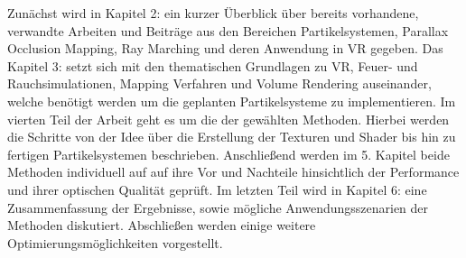 Zunächst wird in Kapitel 2: \textbf{} ein kurzer Überblick über bereits vorhandene, verwandte Arbeiten
und Beiträge aus den Bereichen Partikelsystemen, Parallax Occlusion Mapping, Ray Marching und deren Anwendung in VR gegeben.
Das Kapitel 3: \textbf{} setzt sich mit den thematischen Grundlagen zu VR, Feuer- und Rauchsimulationen,
Mapping Verfahren und Volume Rendering auseinander, welche benötigt werden um die geplanten Partikelsysteme zu implementieren.
Im vierten Teil der Arbeit geht es um die \textbf{} der gewählten Methoden. Hierbei werden die Schritte 
von der Idee über die Erstellung der Texturen und Shader bis hin zu fertigen Partikelsystemen beschrieben.
Anschließend werden im 5. Kapitel \textbf{} beide  Methoden individuell auf auf ihre Vor und Nachteile hinsichtlich 
der Performance und ihrer optischen Qualität geprüft. 
Im letzten Teil wird in Kapitel 6: \textbf{} eine Zusammenfassung der Ergebnisse, sowie mögliche Anwendungsszenarien
der Methoden diskutiert. Abschließen werden einige weitere Optimierungsmöglichkeiten vorgestellt. 



